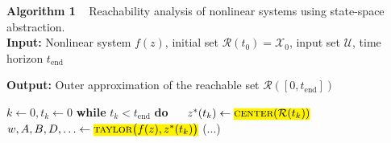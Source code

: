 \textbf{Algorithm 1} ~ Reachability analysis of nonlinear systems using state-space abstraction. \\
\textbf{Input:} Nonlinear system $f(z)$, initial set $\mathcal{R}(t_0) = \mathcal{X}_0$, input set $\mathcal{U}$, time horizon $t_{\text{end}}$

\textbf{Output:} Outer approximation of the reachable set $\mathcal{R}([0,t_{\text{end}}])$

\begin{algorithmic}[1]
	\State $k \gets 0, t_k \gets 0$
	\State \textbf{while} $t_k < t_{\text{end}}$ \textbf{do}
	\State $\quad$ $z^*(t_k) \gets \highlightpartmath{\textsc{center}(\mathcal{R}(t_k))}$
	\State $\quad$ $w, A, B, D, \ldots \gets \highlightpartmath{\textsc{taylor}\big(f(z), z^*(t_k)\big)}$
	\State (...)
\end{algorithmic}